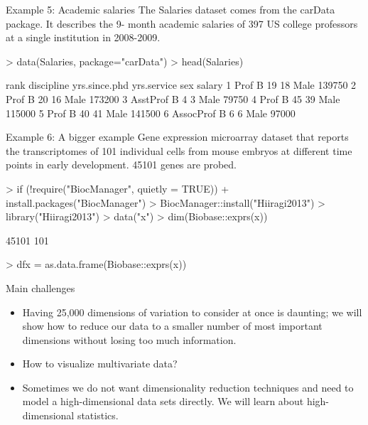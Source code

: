 \documentclass[11pt,handout,aspectratio=169]{beamer}
\begin{document}
\begin{frame}[fragile]{Example 5: Academic salaries}
The Salaries dataset comes from the carData package. It describes the 9-
month academic salaries of 397 US college professors at a single institution in
2008-2009.
\scriptsize
\begin{Schunk}
\begin{Sinput}
> 	data(Salaries, package="carData")
> head(Salaries)
\end{Sinput}
\begin{Soutput}
       rank discipline yrs.since.phd yrs.service  sex salary
1      Prof          B            19          18 Male 139750
2      Prof          B            20          16 Male 173200
3  AsstProf          B             4           3 Male  79750
4      Prof          B            45          39 Male 115000
5      Prof          B            40          41 Male 141500
6 AssocProf          B             6           6 Male  97000
\end{Soutput}
\end{Schunk}
\end{frame}

\begin{frame}[fragile]{Example 6: A bigger example }
Gene expression microarray dataset that reports the transcriptomes of 101 individual cells from mouse embryos at different time points in early development. 45101 genes are probed.
\scriptsize
\begin{Schunk}
\begin{Sinput}
> if (!require("BiocManager", quietly = TRUE))
+     install.packages("BiocManager")
> BiocManager::install("Hiiragi2013")
> library("Hiiragi2013")
> data("x")
> dim(Biobase::exprs(x))
\end{Sinput}
\begin{Soutput}
[1] 45101   101
\end{Soutput}
\begin{Sinput}
> dfx = as.data.frame(Biobase::exprs(x))
\end{Sinput}
\end{Schunk}
\end{frame}

\begin{frame}{Main challenges}
\begin{itemize}
	\item Having 25{,}000 dimensions of variation to consider at once is daunting; we will show how to reduce our data to a smaller number of most important dimensions without losing too much information.
	\item How to visualize multivariate data?
	\item Sometimes we do not want dimensionality reduction techniques and need to model a high-dimensional data sets directly. We will learn about high-dimensional statistics. 
\end{itemize}	
\end{frame}
 
\end{document}
